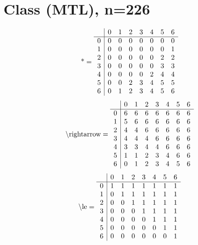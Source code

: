 \documentclass[11pt]{article}
\begin{document}
\section{Class (MTL), n=226}
\[\text{*} = 
\begin{array}{r | r r r r r r r}
 & 0 & 1 & 2 & 3 & 4 & 5 & 6 \\ \hline
0 & 0 & 0 & 0 & 0 & 0 & 0 & 0 \\
1 & 0 & 0 & 0 & 0 & 0 & 0 & 1 \\
2 & 0 & 0 & 0 & 0 & 0 & 2 & 2 \\
3 & 0 & 0 & 0 & 0 & 0 & 3 & 3 \\
4 & 0 & 0 & 0 & 0 & 2 & 4 & 4 \\
5 & 0 & 0 & 2 & 3 & 4 & 5 & 5 \\
6 & 0 & 1 & 2 & 3 & 4 & 5 & 6 \\
\end{array}
\]
\[\text{\textbackslash rightarrow} = 
\begin{array}{r | r r r r r r r}
 & 0 & 1 & 2 & 3 & 4 & 5 & 6 \\ \hline
0 & 6 & 6 & 6 & 6 & 6 & 6 & 6 \\
1 & 5 & 6 & 6 & 6 & 6 & 6 & 6 \\
2 & 4 & 4 & 6 & 6 & 6 & 6 & 6 \\
3 & 4 & 4 & 4 & 6 & 6 & 6 & 6 \\
4 & 3 & 3 & 4 & 4 & 6 & 6 & 6 \\
5 & 1 & 1 & 2 & 3 & 4 & 6 & 6 \\
6 & 0 & 1 & 2 & 3 & 4 & 5 & 6 \\
\end{array}
\]
\[\text{\textbackslash le} = 
\begin{array}{r | r r r r r r r}
 & 0 & 1 & 2 & 3 & 4 & 5 & 6 \\ \hline
0 & 1 & 1 & 1 & 1 & 1 & 1 & 1 \\
1 & 0 & 1 & 1 & 1 & 1 & 1 & 1 \\
2 & 0 & 0 & 1 & 1 & 1 & 1 & 1 \\
3 & 0 & 0 & 0 & 1 & 1 & 1 & 1 \\
4 & 0 & 0 & 0 & 0 & 1 & 1 & 1 \\
5 & 0 & 0 & 0 & 0 & 0 & 1 & 1 \\
6 & 0 & 0 & 0 & 0 & 0 & 0 & 1 \\
\end{array}
\]
\end{document}
